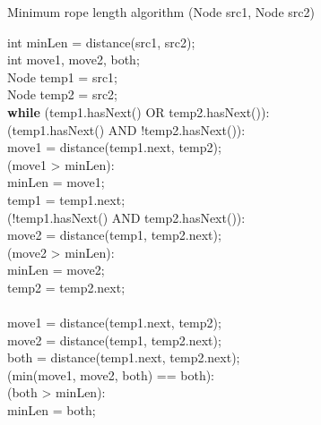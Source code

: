 \documentclass{article}
\begin{document}
\begin{algorithm}[h]
\caption{  Minimum rope length algorithm (Node src1, Node src2)}
\label{algo}
int minLen = distance(src1, src2);\\
int move1, move2, both;\\
Node temp1 = src1;\\
Node temp2 = src2;\\
{\bf {while}} (temp1.hasNext() OR temp2.hasNext()):\\
	 (temp1.hasNext() AND !temp2.hasNext()):\\
		\hspace{1in}move1 = distance(temp1.next, temp2);\\
		 (move1 > minLen):\\
			\hspace{1.5in}minLen = move1;\\
		\hspace{1in}temp1 = temp1.next;\\
	 (!temp1.hasNext() AND temp2.hasNext()):\\
		\hspace{1in}move2 = distance(temp1, temp2.next);\\
		 (move2 > minLen):\\
			\hspace{1.5in}minLen = move2;\\
		\hspace{1in}temp2 = temp2.next;\\
	\\
		\hspace{1in}move1 = distance(temp1.next, temp2);\\
		\hspace{1in}move2 = distance(temp1, temp2.next);\\
		\hspace{1in}both = distance(temp1.next, temp2.next);\\
		 (min(move1, move2, both) == both):\\
			 (both > minLen):\\
				\hspace{2in}minLen = both;\\

\end{algorithm}
\end{document}
